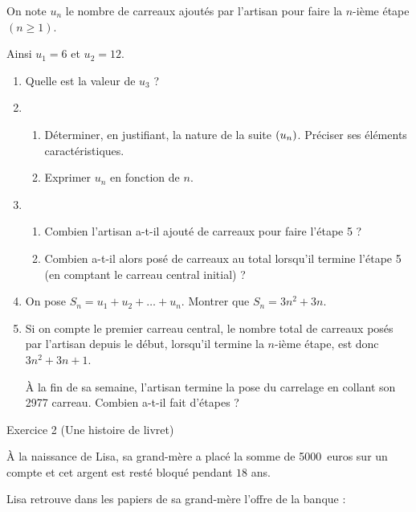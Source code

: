 \documentclass[a4paper,11pt]{article}
\begin{document}
On note $u_n$ le nombre de carreaux ajoutés par l'artisan pour faire la $n$-ième étape $(n \geqslant 1)$. 

Ainsi $u_1 = 6$ et $u_2 = 12$.

\begin{enumerate}
	\item Quelle est la valeur de $u_3$ ?
	\item
	\begin{enumerate}
		\item Déterminer, en justifiant, la nature de la suite $\left( u_n \right)$. Préciser ses éléments caractéristiques.
		\item  Exprimer $u_n$ en fonction de $n$.
	\end{enumerate}
	\item 
	\begin{enumerate}
		\item Combien l'artisan a-t-il ajouté de carreaux pour faire l'étape 5 ? 
		\item Combien a-t-il alors posé de carreaux au total lorsqu'il termine l'étape 5 (en comptant le carreau central initial) ?
	\end{enumerate}
	\item On pose $S_n = u_1 + u_2 + \ldots + u_n$. Montrer que $S_n = 3n^2 + 3n$.
	\item Si on compte le premier carreau central, le nombre total de carreaux posés par l'artisan depuis le début, lorsqu'il termine la $n$-ième étape, est donc $3n^2 + 3n + 1$. 
	
	À la fin de sa semaine, l'artisan termine la pose du carrelage en collant son \num{2977} carreau. Combien a-t-il fait d'étapes ?
\end{enumerate}

\medskip

\begin{blocexo}Exercice 2 \dotfill{}(Une histoire de livret)\end{blocexo}

\smallskip

À la naissance de Lisa, sa grand-mère a placé la somme de \num{5000}~euros sur un compte et cet argent est resté bloqué pendant $18$ ans.

Lisa retrouve dans les papiers de sa grand-mère l'offre de la banque :
\end{document}
